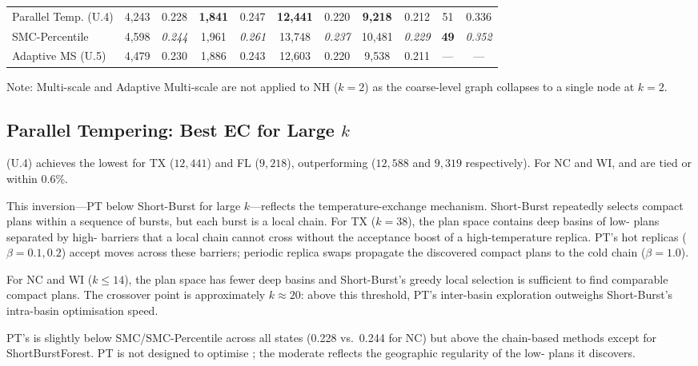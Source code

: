 \begin{table}[ht]
\begin{tabular}{@{}l
  cc cc cc cc cc
  @{}}
\midrule
Parallel Temp. (U.4)   & \dag{}4{,}243 & \dag{}0.228 & \dag{}\textbf{1{,}841} & \dag{}0.247 & \dag{}\textbf{12{,}441} & \dag{}0.220 & \dag{}\textbf{9{,}218} & \dag{}0.212 & \dag{}51 & \dag{}0.336 \\
SMC-Percentile          & \dag{}4{,}598 & \dag{}\textit{0.244} & \dag{}1{,}961 & \dag{}\textit{0.261} & \dag{}13{,}748 & \dag{}\textit{0.237} & \dag{}10{,}481 & \dag{}\textit{0.229} & \dag{}\textbf{49} & \dag{}\textit{0.352} \\
Adaptive MS (U.5)      & \dag{}4{,}479 & \dag{}0.230 & \dag{}1{,}886 & \dag{}0.243 & \dag{}12{,}603 & \dag{}0.220 & \dag{} 9{,}538 & \dag{}0.211 & \dag{}--- & \dag{}--- \\
\bottomrule
\end{tabular}
\end{table}

Note: Multi-scale and Adaptive Multi-scale are not applied to NH ($k = 2$)
as the coarse-level graph collapses to a single node at $k = 2$.

\subsection{Parallel Tempering: Best EC for Large \texorpdfstring{$k$}{k}}

\pt{} (U.4) achieves the lowest \ec{} for TX ($12{,}441$) and FL
($9{,}218$), outperforming \sburst{} ($12{,}588$ and $9{,}319$ respectively).
For NC and WI, \pt{} and \sburst{} are tied or within 0.6\%.

This inversion---PT below Short-Burst for large $k$---reflects the
temperature-exchange mechanism.
Short-Burst repeatedly selects compact plans within a sequence of bursts,
but each burst is a local \recom{} chain.
For TX ($k = 38$), the plan space contains deep basins of low-\ec{}
plans separated by high-\ec{} barriers that a local chain cannot cross
without the acceptance boost of a high-temperature replica.
PT's hot replicas ($\beta = 0.1, 0.2$) accept moves across these barriers;
periodic replica swaps propagate the discovered compact plans to the cold
chain ($\beta = 1.0$).

For NC and WI ($k \leq 14$), the plan space has fewer deep basins and
Short-Burst's greedy local selection is sufficient to find comparable compact
plans.
The crossover point is approximately $k \approx 20$: above this threshold,
PT's inter-basin exploration outweighs Short-Burst's intra-basin optimisation
speed.

PT's \pp{} is slightly below SMC/SMC-Percentile across all states
(0.228 vs.\ 0.244 for NC) but above the chain-based methods except for
ShortBurstForest.
PT is not designed to optimise \pp{}; the moderate \pp{} reflects the
geographic regularity of the low-\ec{} plans it discovers.

